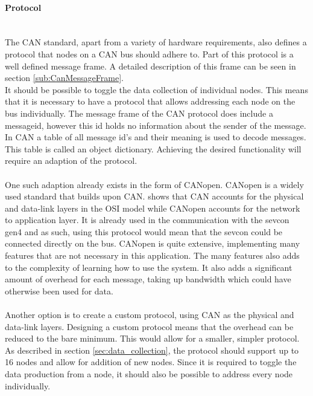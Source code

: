 \paragraph*{Protocol}~\\
The CAN standard, apart from a variety of hardware requirements, also defines a protocol that nodes on a CAN bus should adhere to.
Part of this protocol is a well defined message frame.
A detailed description of this frame can be seen in section \ref{sub:CanMessageFrame}.\\
It should be possible to toggle the data collection of individual nodes.
This means that it is necessary to have a protocol that allows addressing each node on the bus individually.
The message frame of the CAN protocol does include a messageid, however this id holds no information about the sender of the message.
In CAN a table of all message id's and their meaning is used to decode messages.
This table is called an object dictionary.
Achieving the desired functionality will require an adaption of the protocol. 
\\~\\
One such adaption already exists in the form of CANopen.
CANopen is a widely used standard that builds upon CAN.
\cite{CANopen_introduction} shows that CAN accounts for the physical and data-link layers in the OSI model while CANopen accounts for the network to application layer.
It is already used in the communication with the sevcon gen4 and as such, using this protocol would mean that the sevcon could be connected directly on the bus.
CANopen is quite extensive, implementing many features that are not necessary in this application.
The many features also adds to the complexity of learning how to use the system.
It also adds a significant amount of overhead for each message, taking up bandwidth which could have otherwise been used for data. 
\\~\\
Another option is to create a custom protocol, using CAN as the physical and data-link layers.
Designing a custom protocol means that the overhead can be reduced to the bare minimum.
This would allow for a smaller, simpler protocol.
As described in section \ref{sec:data_collection}, the protocol should support up to 16 nodes and allow for addition of new nodes.
Since it is required to toggle the data production from a node, it should also be possible to address every node individually.


